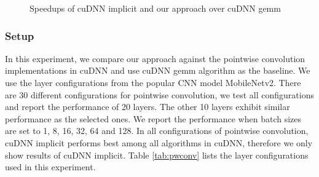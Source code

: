 \begin{figure}
\centering
	
\vspace{-2mm}
\caption{Speedups of cuDNN implicit and our approach over cuDNN gemm} \label{fig:pwexectime}
\vspace{-5mm}
\end{figure}


\subsubsection{Setup} In this experiment, we compare our approach against the pointwise convolution implementations in cuDNN and use cuDNN gemm algorithm as the baseline. 
We use the layer configurations from the popular CNN model MobileNetv2.
There are 30 different configurations for pointwise convolution, we test all configurations and report the performance of 20 layers. 
The other 10 layers exhibit similar performance as the selected ones.  
We report the performance when batch sizes are set to 1, 8, 16, 32, 64 and 128.
In all configurations of pointwise convolution, cuDNN implicit performs best among all algorithms in cuDNN, therefore we only show results of cuDNN implicit.
Table \ref{tab:pwconv} lists the layer configurations used in this experiment.

